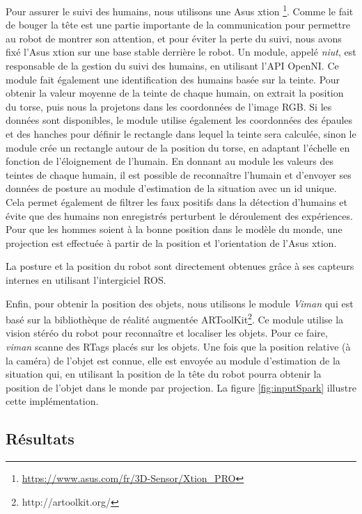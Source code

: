 \documentclass[a4paper,11pt,twoside]{StyleThese}
\begin{document}
Pour assurer le suivi des humains, nous utilisons une Asus xtion \footnote{\url{https://www.asus.com/fr/3D-Sensor/Xtion_PRO}}. Comme le fait de bouger la tête est une partie importante de la communication pour permettre au robot de montrer son attention, et pour éviter la perte du suivi, nous avons fixé l'Asus xtion sur une base stable derrière le robot.
Un module, appelé \textit{niut}, est responsable de la gestion du suivi des humains, en utilisant l'API OpenNI. Ce module fait également une identification des humains basée sur la teinte. Pour obtenir la valeur moyenne de la teinte de chaque humain, on extrait la position du torse, puis nous la projetons dans les coordonnées de l'image RGB. Si les données sont disponibles, le module utilise également les coordonnées des épaules et des hanches pour définir le rectangle dans lequel la teinte sera calculée, sinon le module crée un rectangle autour de la position du torse, en adaptant l'échelle en fonction de l'éloignement de l'humain.
En donnant au module les valeurs des teintes de chaque humain, il est possible de reconnaître l'humain et d'envoyer ses données de posture au module d'estimation de la situation avec un id unique. Cela permet également de filtrer les faux positifs dans la détection d'humains et évite que des humains non enregistrés perturbent le déroulement des expériences.
Pour que les hommes soient à la bonne position dans le modèle du monde, une projection est effectuée à partir de la position et l'orientation de l'Asus xtion.

La posture et la position du robot sont directement obtenues grâce à ses capteurs internes en utilisant l'intergiciel ROS.

Enfin, pour obtenir la position des objets, nous utilisons le module \textit{Viman} qui est basé sur la bibliothèque de réalité augmentée ARToolKit\footnote{http://artoolkit.org/}. Ce module utilise la vision stéréo du robot pour reconnaître et localiser les objets. Pour ce faire, \textit{viman} scanne des RTags placés sur les objets.
Une fois que la position relative (à la caméra) de l'objet est connue, elle est envoyée au module d'estimation de la situation qui, en utilisant la position de la tête du robot pourra obtenir la position de l'objet dans le monde par projection.
La figure \ref{fig:inputSpark} illustre cette implémentation.


\subsection{Résultats}
\label{sec:ResChap2}
\end{document}
